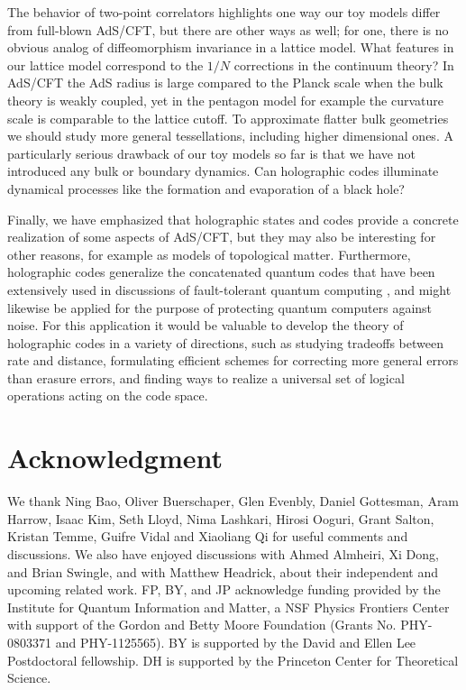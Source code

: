 \documentclass[12pt]{article}
\theoremstyle{plain}
\theoremstyle{plain}
\theoremstyle{plain}
\theoremstyle{plain}
\theoremstyle{result}
\theoremstyle{remark}
\theoremstyle{conjecture}
\theoremstyle{observation}
\theoremstyle{definition}
\theoremstyle{corollary}
\theoremstyle{definition}
\theoremstyle{definition}
\theoremstyle{assumption}
\theoremstyle{definition}
\theoremstyle{problem}
\theoremstyle{fact}
\begin{document}
The behavior of two-point correlators highlights one way our toy models differ from full-blown AdS/CFT, but there are other ways as well; for one, there is no obvious analog of diffeomorphism invariance in a lattice model. What features in our lattice model correspond to the $1/N$ corrections in the continuum theory? In AdS/CFT the AdS radius is large compared to the Planck scale when the bulk theory is weakly coupled, yet in the pentagon model for example the curvature scale is comparable to the lattice cutoff. To approximate flatter bulk geometries we should study more general tessellations, including higher dimensional ones. A particularly serious drawback of our toy models so far is that we have not introduced any bulk or boundary dynamics. Can holographic codes illuminate dynamical processes like the formation and evaporation of a black hole?

Finally, we have emphasized that holographic states and codes provide a concrete realization of some aspects of AdS/CFT, but they may also be interesting for other reasons, for example as models of topological matter. 
Furthermore, holographic codes generalize the concatenated quantum codes that have been extensively used in discussions of fault-tolerant quantum computing \cite{Gottesman2009}, and might likewise be applied for the purpose of protecting quantum computers against noise. 
For this application it would be valuable to develop the theory of holographic codes in a variety of directions, such as studying tradeoffs between rate and distance, formulating efficient schemes for correcting more general errors than erasure errors, and finding ways to realize a universal set of logical operations acting on the code space.

\section*{Acknowledgment}

We thank Ning Bao, Oliver Buerschaper, Glen Evenbly, Daniel Gottesman, Aram Harrow, Isaac Kim, Seth Lloyd, Nima Lashkari, Hirosi Ooguri, Grant Salton, Kristan Temme, Guifre Vidal and Xiaoliang Qi for useful comments and discussions.
We also have enjoyed discussions with Ahmed Almheiri, Xi Dong, and Brian Swingle, and with Matthew Headrick, about their independent and upcoming related work.
FP, BY, and JP acknowledge funding provided by the Institute for Quantum Information and Matter, a NSF Physics Frontiers Center with support of the Gordon and Betty Moore Foundation (Grants No. PHY-0803371 and PHY-1125565). BY is supported by the David and Ellen Lee Postdoctoral fellowship. DH is supported by the Princeton Center for Theoretical Science.  
\end{document}
